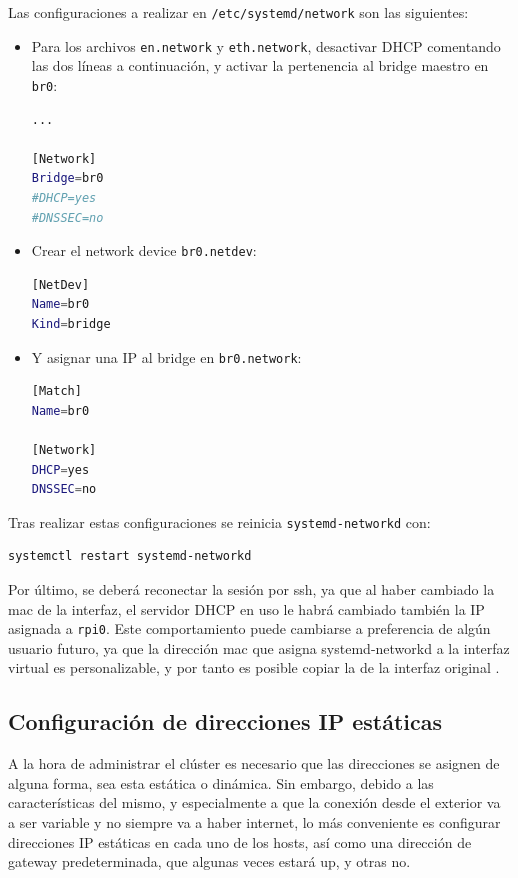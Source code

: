 Las configuraciones a realizar en \texttt{/etc/systemd/network} son las siguientes:

\begin{itemize}
    \item Para los archivos \texttt{en.network} y \texttt{eth.network}, desactivar DHCP comentando las dos líneas a continuación, y activar la pertenencia al bridge maestro en \texttt{br0}:
\begin{lstlisting}[language=bash]
...

[Network]
Bridge=br0
#DHCP=yes
#DNSSEC=no
\end{lstlisting}
    \item Crear el network device \texttt{br0.netdev}:
\begin{lstlisting}[language=bash]
[NetDev]
Name=br0
Kind=bridge
\end{lstlisting}
    \item Y asignar una IP al bridge en \texttt{br0.network}:
\begin{lstlisting}[language=bash]
[Match]
Name=br0

[Network]
DHCP=yes
DNSSEC=no
\end{lstlisting}
\end{itemize}

Tras realizar estas configuraciones se reinicia \texttt{systemd-networkd} con:
\begin{lstlisting}[language=bash]
systemctl restart systemd-networkd
\end{lstlisting}

Por último, se deberá reconectar la sesión por \acrshort{ssh}, ya que al haber cambiado la \acrshort{mac} de la interfaz, el servidor DHCP en uso le habrá cambiado también la IP asignada a \texttt{rpi0}. Este comportamiento puede cambiarse a preferencia de algún usuario futuro, ya que la dirección \acrshort{mac} que asigna systemd-networkd a la interfaz virtual es personalizable, y por tanto es posible copiar la de la interfaz original \cite{archwiki_systemd-networkd}.

\subsection{Configuración de direcciones IP estáticas}
\label{ssec:configuracion_ip_estaticas}
A la hora de administrar el clúster es necesario que las direcciones se asignen de alguna forma, sea esta estática o dinámica. Sin embargo, debido a las características del mismo, y especialmente a que la conexión desde el exterior va a ser variable y no siempre va a haber internet, lo más conveniente es configurar direcciones IP estáticas en cada uno de los hosts, así como una dirección de gateway predeterminada, que algunas veces estará up, y otras no.

